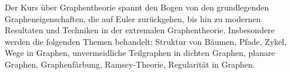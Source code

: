 \begin{module}
\begin{content}
Der Kurs über Graphentheorie spannt den Bogen von den grundlegenden Grapheneigenschaften, die auf Euler zurückgehen, bis hin zu modernen Resultaten und Techniken in der extremalen Graphentheorie. Insbesondere werden die folgenden Themen behandelt: Struktur von Bäumen, Pfade, Zykel, Wege in Graphen, unvermeidliche Teilgraphen in dichten Graphen, planare Graphen, Graphenfärbung, Ramsey-Theorie, Regularität in Graphen.


\end{content}



\end{module}

